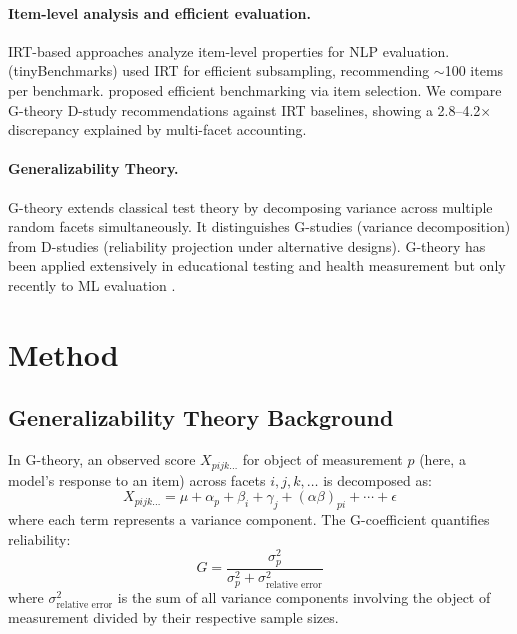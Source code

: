 \documentclass[11pt,twocolumn]{article}
\begin{document}
\paragraph{Item-level analysis and efficient evaluation.}
IRT-based approaches \citep{lalor2019,rodriguez2021,vania2021} analyze item-level properties for NLP evaluation.
\citet{polo2024} (tinyBenchmarks) used IRT for efficient subsampling, recommending $\sim$100 items per benchmark.
\citet{perlitz2023} proposed efficient benchmarking via item selection.
We compare G-theory D-study recommendations against IRT baselines, showing a 2.8--4.2$\times$ discrepancy explained by multi-facet accounting.

\paragraph{Generalizability Theory.}
G-theory \citep{cronbach1972,shavelson1991,brennan2001} extends classical test theory by decomposing variance across multiple random facets simultaneously.
It distinguishes G-studies (variance decomposition) from D-studies (reliability projection under alternative designs).
G-theory has been applied extensively in educational testing and health measurement but only recently to ML evaluation \citep{mesting2026}.

\section{Method}

\subsection{Generalizability Theory Background}

In G-theory, an observed score $X_{pijk\ldots}$ for object of measurement $p$ (here, a model's response to an item) across facets $i,j,k,\ldots$ is decomposed as:
\begin{equation}
X_{pijk\ldots} = \mu + \alpha_p + \beta_i + \gamma_j + (\alpha\beta)_{pi} + \cdots + \epsilon
\end{equation}
where each term represents a variance component.
The G-coefficient quantifies reliability:
\begin{equation}
G = \frac{\sigma^2_p}{\sigma^2_p + \sigma^2_{\text{relative error}}}
\end{equation}
where $\sigma^2_{\text{relative error}}$ is the sum of all variance components involving the object of measurement divided by their respective sample sizes.
\end{document}
